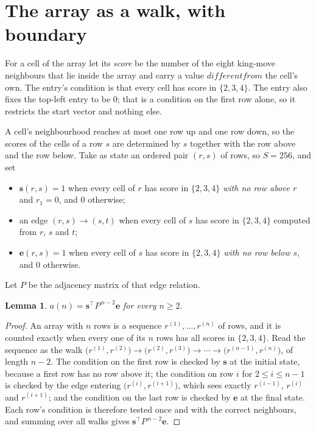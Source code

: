 \documentclass[11pt,a4paper]{article}
\theoremstyle{plain}
\newtheorem{lemma}[theorem]{Lemma}
\theoremstyle{definition}
\begin{document}
\section{The array as a walk, with boundary}

For a cell of the array let its \emph{score} be the number of the eight king-move neighbours that lie inside
the array and carry a value $different from$ the cell's own. The entry's condition is that every cell
has score in $\{2,3,4\}$. The entry also fixes the top-left entry to be $0$; that is a condition on the first row alone, so it restricts the start vector and nothing else.

A cell's neighbourhood reaches at most one row up and one row down, so the scores of the
cells of a row $s$ are determined by $s$ together with the row above and the row below.
Take as state an ordered pair $(r,s)$ of rows, so $S=256$, and set
\begin{itemize}
\item $\mathbf{s}(r,s)=1$ when every cell of $r$ has score in $\{2,3,4\}$ \emph{with no row
above $r$} and $r_1=0$, and $0$ otherwise;
\item an edge $(r,s)\to(s,t)$ when every cell of $s$ has score in $\{2,3,4\}$ computed from
$r$, $s$ and $t$;
\item $\mathbf{e}(r,s)=1$ when every cell of $s$ has score in $\{2,3,4\}$ \emph{with no row
below $s$}, and $0$ otherwise.
\end{itemize}
Let $P$ be the adjacency matrix of that edge relation.

\begin{lemma}\label{lem:walk}
$a(n)=\mathbf{s}^{\!\top}P^{\,n-2}\mathbf{e}$ for every $n\ge2$.
\end{lemma}

\begin{proof}
An array with $n$ rows is a sequence $r^{(1)},\dots,r^{(n)}$ of rows, and it is counted
exactly when every one of its $n$ rows has all scores in $\{2,3,4\}$. Read the sequence as the
walk $\bigl(r^{(1)},r^{(2)}\bigr)\to\bigl(r^{(2)},r^{(3)}\bigr)\to\cdots\to
\bigl(r^{(n-1)},r^{(n)}\bigr)$, of length $n-2$. The condition on the first row is
checked by $\mathbf{s}$ at the initial state, because a first row has no row above it; the
condition on row $i$ for $2\le i\le n-1$ is checked by the edge entering
$\bigl(r^{(i)},r^{(i+1)}\bigr)$, which sees exactly $r^{(i-1)}$, $r^{(i)}$ and
$r^{(i+1)}$; and the condition on the last row is checked by $\mathbf{e}$ at the final
state. Each row's condition is therefore tested once and with the correct neighbours, and
summing over all walks gives $\mathbf{s}^{\!\top}P^{\,n-2}\mathbf{e}$.
\end{proof}
\end{document}
